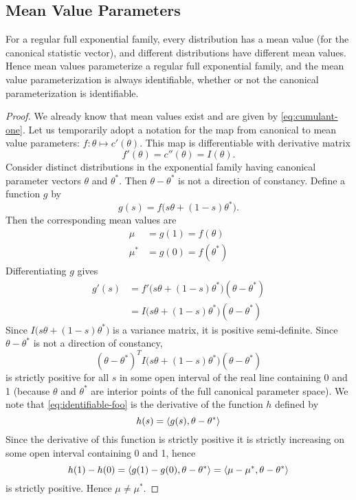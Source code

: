 \subsection{Mean Value Parameters}

\begin{theorem} \label{th:mean-value}
For a regular full exponential family, every distribution has a mean
value (for the canonical statistic vector), and different distributions
have different mean values.  Hence mean values parameterize a regular
full exponential family, and the mean value parameterization is always
identifiable, whether or not the canonical parameterization is identifiable.
\end{theorem}
\begin{proof}
We already know that mean values exist and are given by \eqref{eq:cumulant-one}.
Let us temporarily adopt a notation for the map from canonical to mean value
parameters: $f : \theta \mapsto c'(\theta)$.
This map is differentiable with derivative matrix
$$
   f'(\theta) = c''(\theta) = I(\theta).
$$
Consider distinct distributions in the exponential family having
canonical parameter vectors $\theta$ and $\theta^*$.
Then $\theta - \theta^*$ is not a direction of constancy.
Define a function $g$ by
$$
   g(s) = f\bigl(s \theta + (1 - s) \theta^*\bigr).
$$
Then the corresponding mean values are
\begin{align*}
   \mu & = g(1) = f(\theta)
   \\
   \mu^* & = g(0) = f(\theta^*)
\end{align*}
Differentiating $g$ gives
\begin{align*}
   g'(s)
   & =
   f'\bigl(s \theta + (1 - s) \theta^*\bigr) (\theta - \theta^*)
   \\
   & =
   I\bigl(s \theta + (1 - s) \theta^*\bigr) (\theta - \theta^*)
\end{align*}
Since $I\bigl(s \theta + (1 - s) \theta^*\bigr)$ is a variance matrix,
it is positive semi-definite.
Since $\theta - \theta^*$ is not a direction of constancy,
\begin{equation} \label{eq:identifiable-foo}
   (\theta - \theta^*)^T
   I\bigl(s \theta + (1 - s) \theta^*\bigr) (\theta - \theta^*)
\end{equation}
is strictly positive for all $s$ in some open interval of the real line
containing 0 and 1 (because $\theta$ and $\theta^*$ are interior points
of the full canonical parameter space).
We note that \eqref{eq:identifiable-foo} is the
derivative of the function $h$ defined by
$$
   h(s) = \langle g(s), \theta - \theta^* \rangle
$$
Since the derivative of this function is strictly positive it is strictly
increasing on some open interval containing 0 and 1, hence
$$
   h(1) - h(0) = \langle g(1) - g(0), \theta - \theta^* \rangle
   = \langle \mu - \mu^*, \theta - \theta^* \rangle
$$
is strictly positive.  Hence $\mu \neq \mu^*$.
\end{proof}

